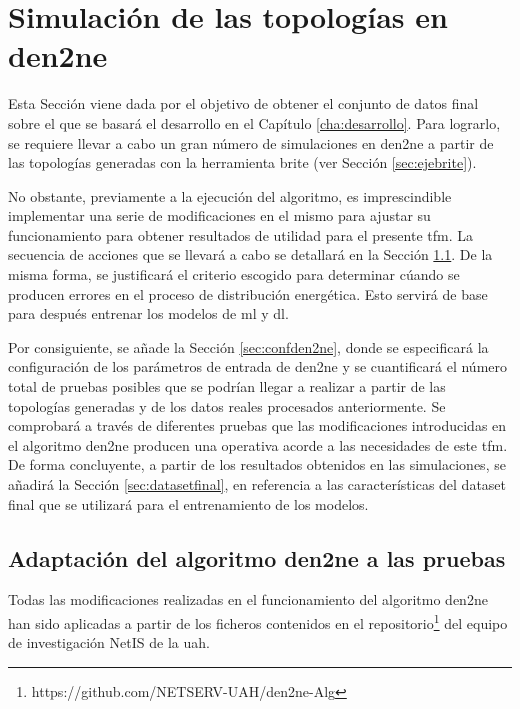 \section{Simulación de las topologías en \acrshort{den2ne}}

Esta Sección viene dada por el objetivo de obtener el conjunto de datos final sobre el que se basará el desarrollo en el Capítulo \ref{cha:desarrollo}. Para lograrlo, se requiere llevar a cabo un gran número de  simulaciones en \gls{den2ne} a partir de las topologías generadas con la herramienta \gls{brite} (ver Sección \ref{sec:ejebrite}). 

\vspace{3mm}

No obstante, previamente a la ejecución del algoritmo, es imprescindible implementar una serie de modificaciones en el mismo para ajustar su funcionamiento para obtener resultados de utilidad para el presente \gls{tfm}. La secuencia de acciones que se llevará a cabo se detallará en la Sección \ref{sec:cambiosden2ne}. De la misma forma, se justificará el criterio escogido para determinar cúando se producen errores en el proceso de distribución energética. Esto servirá de base para después entrenar los modelos de \gls{ml} y \gls{dl}.

\vspace{3mm}

Por consiguiente, se añade la Sección \ref{sec:confden2ne}, donde se especificará la configuración de los parámetros de entrada de \gls{den2ne} y se cuantificará el número total de pruebas posibles que se podrían llegar a realizar a partir de las topologías generadas y de los datos reales procesados anteriormente. Se comprobará a través de diferentes pruebas que las modificaciones introducidas en el algoritmo \gls{den2ne} producen una operativa acorde a las necesidades de este \gls{tfm}. De forma concluyente, a partir de los resultados obtenidos en las simulaciones, se añadirá la Sección \ref{sec:datasetfinal}, en referencia a las características del dataset final que se utilizará para el entrenamiento de los modelos.

\subsection{Adaptación del algoritmo \acrshort{den2ne} a las pruebas}
\label{sec:cambiosden2ne}

Todas las modificaciones realizadas en el funcionamiento del algoritmo \acrshort{den2ne} han sido aplicadas a partir de los ficheros contenidos en el repositorio\footnote{https://github.com/NETSERV-UAH/den2ne-Alg} del equipo de investigación NetIS de la \gls{uah}.

